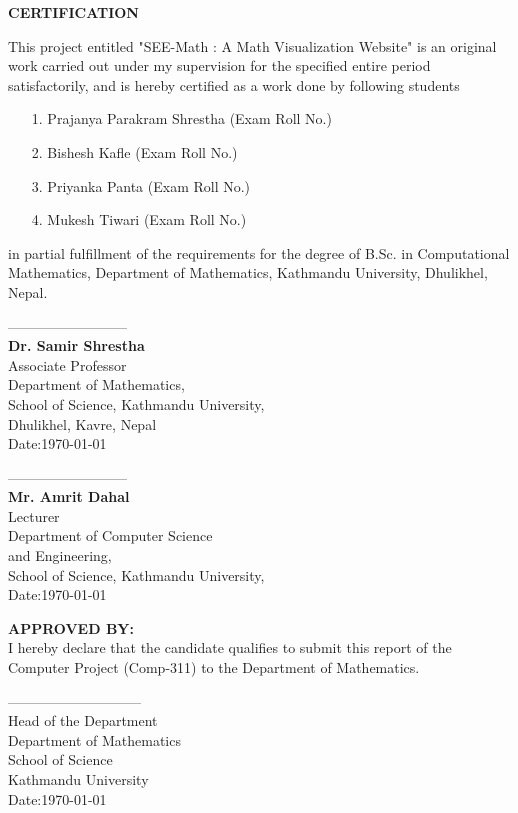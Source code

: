 



\begin{center}
	{\Large{\bf{ CERTIFICATION}}}
\end{center}


\noindent
This project entitled "SEE-Math : A Math Visualization Website" is an original work carried out  under my supervision for the specified entire period satisfactorily, and is hereby certified as a work done by following students
\begin{itemize}
\item[1.] Prajanya Parakram Shrestha (Exam Roll No.)
\item[2.] Bishesh Kafle (Exam Roll No.)
\item[3.] Priyanka Panta (Exam Roll No.)
\item[4.] Mukesh Tiwari (Exam Roll No.)
\end{itemize}
 in partial fulfillment of the requirements for the degree of B.Sc. in Computational Mathematics, Department of Mathematics, Kathmandu University, Dhulikhel, Nepal.

\vspace{2cm}


\begin{minipage}{0.6\linewidth}
	\noindent
	--------------------------\\          
	{\bf Dr. Samir Shrestha}\\
	Associate Professor \\
	Department of Mathematics,\\
	School of Science, Kathmandu University,\\
	Dhulikhel, Kavre, Nepal\\
	Date:\today
\end{minipage}
\begin{minipage}{0.5\linewidth}
	\noindent
	--------------------------\\          
	{\bf Mr. Amrit Dahal}\\
	Lecturer \\
	Department of Computer Science\\ and Engineering,\\
	School of Science, Kathmandu University,\\
	Date:\today
\end{minipage}


\vspace{1cm}

\noindent
{\bf APPROVED BY:}\\
I hereby declare that the candidate qualifies to submit this  report of the Computer Project (Comp-311) to the Department of Mathematics. 



\vspace{2cm}

\noindent
-----------------------------\\
Head of the Department\\
Department of Mathematics\\
School of Science\\
Kathmandu University\\
Date:\today
  